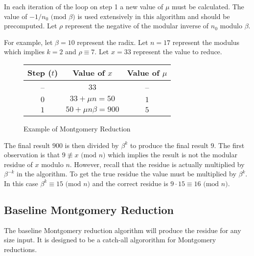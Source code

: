 \documentclass[b5paper]{book}
\def\nequiv{\not\equiv}
\begin{document}
In each iteration of the loop on step 1 a new value of $\mu$ must be calculated.  The value of $-1/n_0 \mbox{ (mod }\beta\mbox{)}$ is used 
extensively in this algorithm and should be precomputed.  Let $\rho$ represent the negative of the modular inverse of $n_0$ modulo $\beta$.  

For example, let $\beta = 10$ represent the radix.  Let $n = 17$ represent the modulus which implies $k = 2$ and $\rho \equiv 7$.  Let $x = 33$ 
represent the value to reduce.

\newpage\begin{figure}
\begin{center}
\begin{tabular}{|c|c|c|}
\hline \textbf{Step ($t$)} & \textbf{Value of $x$} & \textbf{Value of $\mu$} \\
\hline --                 & $33$ & --\\
\hline $0$                 & $33 + \mu n = 50$ & $1$ \\
\hline $1$                 & $50 + \mu n \beta = 900$ & $5$ \\
\hline
\end{tabular}
\end{center}
\caption{Example of Montgomery Reduction}
\end{figure}

The final result $900$ is then divided by $\beta^k$ to produce the final result $9$.  The first observation is that $9 \nequiv x \mbox{ (mod }n\mbox{)}$ 
which implies the result is not the modular residue of $x$ modulo $n$.  However, recall that the residue is actually multiplied by $\beta^{-k}$ in
the algorithm.  To get the true residue the value must be multiplied by $\beta^k$.  In this case $\beta^k \equiv 15 \mbox{ (mod }n\mbox{)}$ and
the correct residue is $9 \cdot 15 \equiv 16 \mbox{ (mod }n\mbox{)}$.  

\subsection{Baseline Montgomery Reduction}
The baseline Montgomery reduction algorithm will produce the residue for any size input.  It is designed to be a catch-all algororithm for 
Montgomery reductions.  
\end{document}
